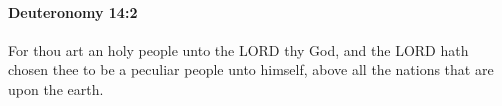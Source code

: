 
		\paragraph{Deuteronomy 14:2} %
			\label{DEUTERONOMY-14-2}

			For thou art an holy people unto the LORD thy God, and the LORD hath chosen thee to be a peculiar people unto himself, above all the nations that are upon the earth.


